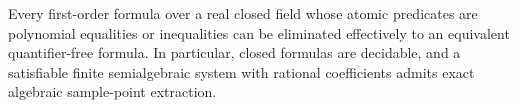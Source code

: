 Every first-order formula over a real closed field whose atomic predicates are polynomial equalities or inequalities can be eliminated effectively to an equivalent quantifier-free formula.  In particular, closed formulas are decidable, and a satisfiable finite semialgebraic system with rational coefficients admits exact algebraic sample-point extraction.